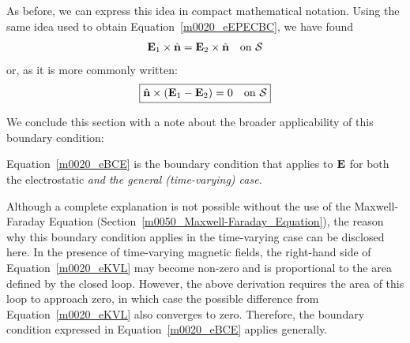 As before, we can express this idea in compact mathematical notation.
Using the same idea used to obtain Equation~\ref{m0020_eEPECBC}, we have found
%
\begin{equation}
{\bf E}_1 \times \hat{\bf n} = {\bf E}_2 \times \hat{\bf n}~~~\mbox{on $\mathcal{S}$}
\end{equation}
%
or, as it is more commonly written:
%
\begin{equation}
\boxed{
\hat{\bf n} \times \left( {\bf E}_1 - {\bf E}_2 \right) = 0~~~\mbox{on $\mathcal{S}$}
}
\label{m0020_eBCE}
\end{equation} 

We conclude this section with a note about the broader applicability of this boundary condition:
%
\begin{mdframed}[backgroundcolor=yellow!20,nobreak=true] 
Equation~\ref{m0020_eBCE} is the boundary condition that applies to ${\bf E}$ for both the electrostatic \emph{and the general (time-varying) case.}
\end{mdframed}
%
Although a complete explanation is not possible without the use of the Maxwell-Faraday Equation (Section~\ref{m0050_Maxwell-Faraday_Equation}), the reason why this boundary condition applies in the time-varying case can be disclosed here.
In the presence of time-varying magnetic fields, the right-hand side of Equation~\ref{m0020_eKVL} may become non-zero and is proportional to the area defined by the closed loop. 
However, the above derivation requires the area of this loop to approach zero, in which case the possible difference from Equation~\ref{m0020_eKVL} also converges to zero.
Therefore, the boundary condition expressed in Equation~\ref{m0020_eBCE} applies generally.


